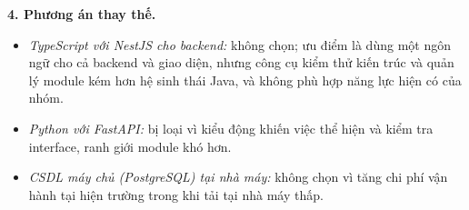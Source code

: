 \noindent\textbf{4. Phương án thay thế.}
\begin{itemize}
    \item \textit{TypeScript với NestJS cho backend:} không chọn; ưu điểm là dùng một ngôn ngữ cho cả backend và giao diện, nhưng công cụ kiểm thử kiến trúc và quản lý module kém hơn hệ sinh thái Java, và không phù hợp năng lực hiện có của nhóm.
    \item \textit{Python với FastAPI:} bị loại vì kiểu động khiến việc thể hiện và kiểm tra interface, ranh giới module khó hơn.
    \item \textit{CSDL máy chủ (PostgreSQL) tại nhà máy:} không chọn vì tăng chi phí vận hành tại hiện trường trong khi tải tại nhà máy thấp.
\end{itemize}
